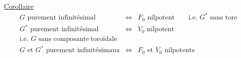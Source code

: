 \uline{Corollaire}
\[
\begin{array}{rcl}
G\text{ purement infinitésimal}&\Longleftrightarrow&F_0\text{ nilpotent}\qquad\text{i.e. }G^*\text{ sans tore}\\
G^*\text{ purement infinitésimal}&\Longleftrightarrow&V_0\text{ nilpotent}\\[-2pt]
\text{i.e. }G\text{ sans composante}\ \text{toroïdale}&&\\
G\text{ et }G^*\text{ purement infinitésimaux}&\Longleftrightarrow&F_0\text{ et }V_0\text{ nilpotents}
\end{array}
\]
